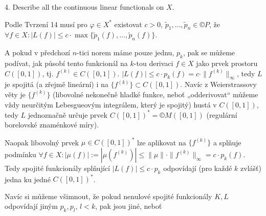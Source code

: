 \documentclass[12pt]{article}					%
\begin{document}
\begin{priklad}[11]
	4. Describe all the continuous linear functionals on $X$.

	\begin{reseni}
		Podle Tvrzení 14 musí pro $φ \in X^*$ existovat $c > 0$, $\tilde p_1, …, \tilde p_n \in ©P$, že $\forall f \in X: |L(f)| ≤ c·\max\{\tilde p_1(f), …, \tilde p_n(f)\}$.

		A pokud v předchozí $n$-tici norem máme pouze jednu, $p_k$, pak se můžeme podívat, jak působí tento funkcionál na $k$-tou derivaci $f \in X$ jako prvek prostoru $C([0, 1])$, tj. $f^{(k)} \in C([0, 1])$. $|L(f)| ≤ c·p_k(f) = c·\|f^{(k)}\|_∞$, tedy $L$ je spojitá (a zřejmě lineární) i na $\{f^{(k)}\} \subset C([0, 1])$. Navíc z Weierstrassovy věty je $\{f^{(k)}\}$ (libovolné nekonečně hladké funkce, neboť „odderivovat“ můžeme vždy neurčitým Lebesgueovým integrálem, který je spojitý) hustá v $C([0, 1])$, tedy $L$ jednoznačně určuje prvek $C([0, 1])^* = ©M([0, 1])$ (regulární borelovské znaménkové míry).

		Naopak libovolný prvek $μ \in C([0, 1])^*$ lze aplikovat na $\{f^{(k)}\}$ a splňuje podmínku $\forall f \in X: |μ(f)| := |μ(f^{(k)})| ≤ \|μ\| · \|f^{(k)}\|_∞ = c·p_k(f)$. Tedy spojité funkcionály splňující $|L(f)| ≤ c·p_k$ odpovídají (pro každé $k$ zvlášť) jedna ku jedné $C([0, 1])^*$.

		Navíc si můžeme všimnout, že pokud nenulové spojité funkcionály $K, L$ odpovídají jiným $p_k, p_l$, $l < k$, pak jsou jiné, neboť 
	\end{reseni}
\end{priklad}
\end{document}
